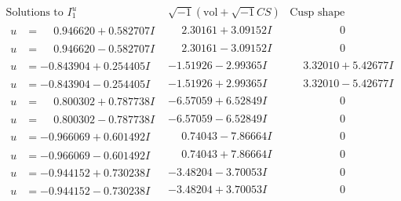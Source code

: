 \documentclass[1p]{elsarticle_modified}
\theoremstyle{definition}
\newcommand{\I}{\sqrt{-1}}
\begin{document}
$$\begin{array}{c|c|c}
\text{Solutions to }I^u_{1}& \I (\text{vol} + \sqrt{-1}CS) & \text{Cusp shape}\\
 \hline 
\begin{aligned}
u &= \phantom{-}0.946620 + 0.582707 I\end{aligned}
 & \phantom{-}2.30161 + 3.09152 I & \phantom{-0.000000 } 0 \\ \hline\begin{aligned}
u &= \phantom{-}0.946620 - 0.582707 I\end{aligned}
 & \phantom{-}2.30161 - 3.09152 I & \phantom{-0.000000 } 0 \\ \hline\begin{aligned}
u &= -0.843904 + 0.254405 I\end{aligned}
 & -1.51926 - 2.99365 I & \phantom{-}3.32010 + 5.42677 I \\ \hline\begin{aligned}
u &= -0.843904 - 0.254405 I\end{aligned}
 & -1.51926 + 2.99365 I & \phantom{-}3.32010 - 5.42677 I \\ \hline\begin{aligned}
u &= \phantom{-}0.800302 + 0.787738 I\end{aligned}
 & -6.57059 + 6.52849 I & \phantom{-0.000000 } 0 \\ \hline\begin{aligned}
u &= \phantom{-}0.800302 - 0.787738 I\end{aligned}
 & -6.57059 - 6.52849 I & \phantom{-0.000000 } 0 \\ \hline\begin{aligned}
u &= -0.966069 + 0.601492 I\end{aligned}
 & \phantom{-}0.74043 - 7.86664 I & \phantom{-0.000000 } 0 \\ \hline\begin{aligned}
u &= -0.966069 - 0.601492 I\end{aligned}
 & \phantom{-}0.74043 + 7.86664 I & \phantom{-0.000000 } 0 \\ \hline\begin{aligned}
u &= -0.944152 + 0.730238 I\end{aligned}
 & -3.48204 - 3.70053 I & \phantom{-0.000000 } 0 \\ \hline\begin{aligned}
u &= -0.944152 - 0.730238 I\end{aligned}
 & -3.48204 + 3.70053 I & \phantom{-0.000000 } 0 \\ \hline\begin{aligned}

\end{aligned}
\end{array}$$
\end{document}
